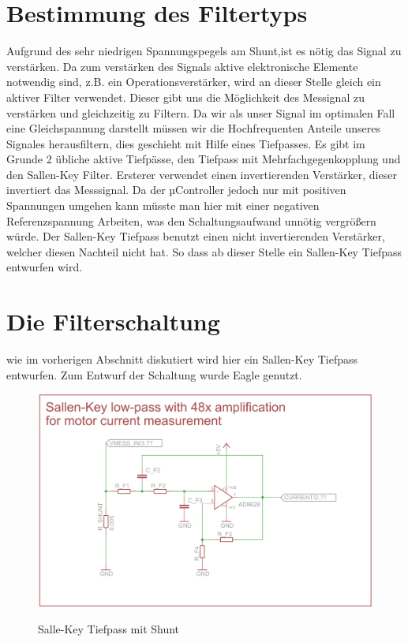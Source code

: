 \section{Bestimmung des Filtertyps}
Aufgrund des sehr niedrigen Spannungspegels am Shunt,ist es nötig das Signal zu verstärken. Da zum verstärken des Signals aktive elektronische Elemente notwendig sind,
z.B. ein Operationsverstärker, wird an dieser Stelle gleich ein aktiver Filter verwendet. Dieser gibt uns die Möglichkeit des Messignal zu verstärken und gleichzeitig zu
Filtern. Da wir als unser Signal im optimalen Fall eine Gleichspannung darstellt müssen wir die Hochfrequenten Anteile unseres Signales herausfiltern, dies geschieht 
mit Hilfe eines Tiefpasses. Es gibt im Grunde 2 übliche aktive Tiefpässe, den Tiefpass mit Mehrfachgegenkopplung und den Sallen-Key Filter. Ersterer verwendet
einen invertierenden Verstärker, dieser invertiert das Messsignal. Da der µController jedoch nur mit positiven Spannungen umgehen kann müsste man hier mit einer 
negativen Referenzspannung Arbeiten, was den Schaltungsaufwand unnötig vergrößern würde. Der Sallen-Key Tiefpass benutzt einen nicht invertierenden Verstärker, welcher diesen
Nachteil nicht hat. So dass ab dieser Stelle ein Sallen-Key Tiefpass entwurfen wird.


\section{Die Filterschaltung}

wie im vorherigen Abschnitt diskutiert wird hier ein Sallen-Key Tiefpass entwurfen. Zum Entwurf der Schaltung wurde Eagle genutzt.

\begin{figure}[H]
\centering
\includegraphics[width=.8\textwidth]{filter_schaltung.png}\\
\caption{Salle-Key Tiefpass mit Shunt}%
\label{fig:fschalt}
\end{figure}



